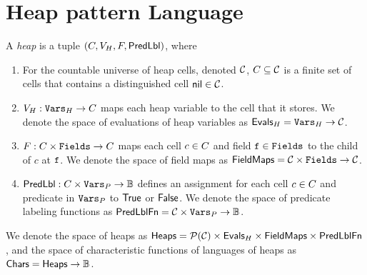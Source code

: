 \section{Heap pattern Language}
\label{sec:patterns}

\begin{defn}
  \label{defn:states}
  A \lang \emph{heap} is a tuple $(C, V_H,
  F, \mathsf{PredLbl})$, where
  \begin{enumerate}
  \item
    For the countable universe of heap cells, denoted $\mathcal{C}$,
    $C \subseteq \mathcal{C}$ is a finite set of cells that contains
    a distinguished cell $\mathsf{nil} \in \mathcal{C}$.
  \item
    $V_H: \mathtt{Vars}_H \to C$ maps each heap variable to
    the cell that it stores.
    We denote the space of evaluations of heap variables as
    $\mathsf{Evals}_H = \mathtt{Vars}_H \to \mathcal{C}$.
  \item
    $F: C \times \mathtt{Fields} \to C$ maps each cell
    $c \in C$ and field $\mathtt{f} \in \mathtt{Fields}$ to the child of
    $c$ at $\mathtt{f}$.
    We denote the space of field maps as $\mathsf{FieldMaps} = \mathcal{C} \times
    \mathtt{Fields} \to \mathcal{C}$.

  \item
    $\mathsf{PredLbl}: C \times \mathtt{Vars}_P \to \mathbb{B}$ defines an assignment for each cell
    $c \in C$ and predicate in $\mathtt{Vars}_P$ to $\mathsf{True}$ or $\mathsf{False}$.
    We denote the space of predicate labeling functions as
    $\mathsf{PredLblFn} = \mathcal{C} \times \mathtt{Vars}_P \to \mathbb{B}$.

  \end{enumerate}
  We denote the space of heaps as $\mathsf{Heaps} = \mathcal{P}(\mathcal{C}) \times
  \mathsf{Evals}_H \times \mathsf{FieldMaps} \times \mathsf{PredLblFn}$, and the space of
  characteristic functions of languages of heaps as $\mathsf{Chars} = \mathsf{Heaps}
  \to \mathbb{B}$.
\end{defn}

